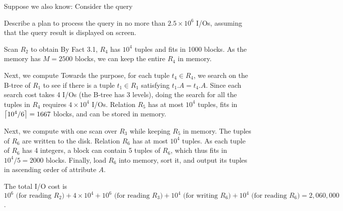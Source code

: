  Suppose we also know:
Consider the query



\noindent Describe a plan to process the query in no more than $2.5 \times 10^6$ I/Os, assuming that the query result is displayed on screen.


\begin{sol}
    Scan $R_2$ to obtain
    By Fact 3.1, $R_4$ has $10^4$ tuples and fits in 1000 blocks. As the memory has $M = 2500$ blocks, we can keep the entire $R_4$ in memory.

    \vgap

    Next, we compute
    Towards the purpose, for each tuple $t_4 \in R_4$, we search on the B-tree of $R_1$ to see if there is a tuple $t_1 \in R_1$ satisfying $t_1.A = t_4.A$. Since each search cost takes 4 I/Os (the B-tree has 3 levels), doing the search for all the tuples in $R_4$ requires $4 \times 10^4$ I/Os. Relation $R_5$ has at most $10^4$ tuples, fits in $\left \lceil 10^4 / 6 \right \rceil = 1667$ blocks, and can be stored in memory.

    \vgap

    Next, we compute
    with one scan over $R_3$ while keeping $R_5$ in memory. The tuples of $R_6$ are written to the disk.
    Relation $R_6$ has at most $10^4$ tuples. As each tuple of $R_6$ has 4 integers, a block can contain 5 tuples of $R_6$, which thus fits in $10^4 / 5 = 2000$ blocks.  Finally, load $R_6$ into memory, sort it, and output its tuples in ascending order of attribute $A$.

    \vgap

    The total I/O cost is $10^6 \text{ (for reading $R_2$)} + 4 \times 10^4 + 10^6 \text{ (for reading $R_3$)} + 10^4 \text{ (for writing $R_6$)} + 10^4 \text{ (for reading $R_6$)} = 2,060,000$.
\end{sol}

